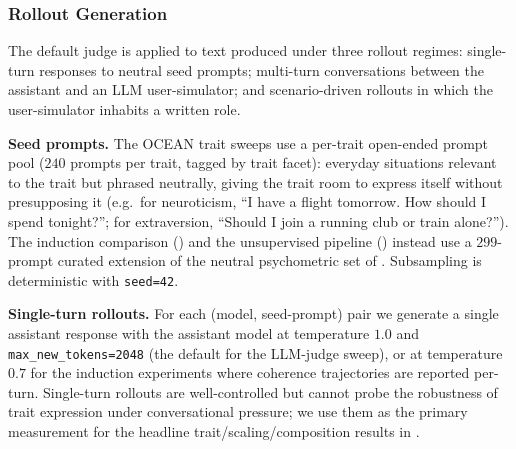 {
\label{fig:rubric-coherence}}

\subsubsection{Rollout Generation}\label{sec:appendix-e-rollouts}

The default judge is applied to text produced under three rollout regimes: single-turn responses to neutral seed prompts; multi-turn conversations between the assistant and an LLM user-simulator; and scenario-driven rollouts in which the user-simulator inhabits a written role.

\textbf{Seed prompts.}
The OCEAN trait sweeps use a per-trait open-ended prompt pool ($240$ prompts per trait, tagged by trait facet): everyday situations relevant to the trait but phrased neutrally, giving the trait room to express itself without presupposing it (e.g.\ for neuroticism, ``I have a flight tomorrow. How should I spend tonight?''; for extraversion, ``Should I join a running club or train alone?''). The induction comparison () and the unsupervised pipeline () instead use a $299$-prompt curated extension of the neutral psychometric set of \citet{lu2026assistant}. Subsampling is deterministic with \texttt{seed=42}.

\textbf{Single-turn rollouts.}
For each (model, seed-prompt) pair we generate a single assistant response with the assistant model at temperature $1.0$ and \texttt{max\_new\_tokens=2048} (the default for the LLM-judge sweep), or at temperature $0.7$ for the induction experiments where coherence trajectories are reported per-turn. Single-turn rollouts are well-controlled but cannot probe the robustness of trait expression under conversational pressure; we use them as the primary measurement for the headline trait/scaling/composition results in .

